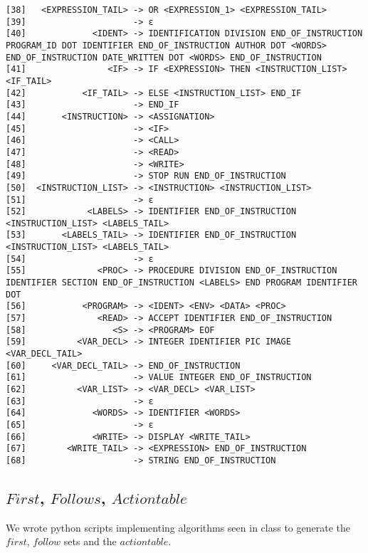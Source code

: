 \begin{lstlisting}[breaklines]
[38]   <EXPRESSION_TAIL> -> OR <EXPRESSION_1> <EXPRESSION_TAIL>
[39]                     -> ε
[40]             <IDENT> -> IDENTIFICATION DIVISION END_OF_INSTRUCTION PROGRAM_ID DOT IDENTIFIER END_OF_INSTRUCTION AUTHOR DOT <WORDS> END_OF_INSTRUCTION DATE_WRITTEN DOT <WORDS> END_OF_INSTRUCTION
[41]                <IF> -> IF <EXPRESSION> THEN <INSTRUCTION_LIST> <IF_TAIL>
[42]           <IF_TAIL> -> ELSE <INSTRUCTION_LIST> END_IF
[43]                     -> END_IF
[44]       <INSTRUCTION> -> <ASSIGNATION>
[45]                     -> <IF>
[46]                     -> <CALL>
[47]                     -> <READ>
[48]                     -> <WRITE>
[49]                     -> STOP RUN END_OF_INSTRUCTION
[50]  <INSTRUCTION_LIST> -> <INSTRUCTION> <INSTRUCTION_LIST>
[51]                     -> ε
[52]            <LABELS> -> IDENTIFIER END_OF_INSTRUCTION <INSTRUCTION_LIST> <LABELS_TAIL>
[53]       <LABELS_TAIL> -> IDENTIFIER END_OF_INSTRUCTION <INSTRUCTION_LIST> <LABELS_TAIL>
[54]                     -> ε
[55]              <PROC> -> PROCEDURE DIVISION END_OF_INSTRUCTION IDENTIFIER SECTION END_OF_INSTRUCTION <LABELS> END PROGRAM IDENTIFIER DOT
[56]           <PROGRAM> -> <IDENT> <ENV> <DATA> <PROC>
[57]              <READ> -> ACCEPT IDENTIFIER END_OF_INSTRUCTION
[58]                 <S> -> <PROGRAM> EOF
[59]          <VAR_DECL> -> INTEGER IDENTIFIER PIC IMAGE <VAR_DECL_TAIL>
[60]     <VAR_DECL_TAIL> -> END_OF_INSTRUCTION
[61]                     -> VALUE INTEGER END_OF_INSTRUCTION
[62]          <VAR_LIST> -> <VAR_DECL> <VAR_LIST>
[63]                     -> ε
[64]             <WORDS> -> IDENTIFIER <WORDS>
[65]                     -> ε
[66]             <WRITE> -> DISPLAY <WRITE_TAIL>
[67]        <WRITE_TAIL> -> <EXPRESSION> END_OF_INSTRUCTION
[68]                     -> STRING END_OF_INSTRUCTION
\end{lstlisting}

\subsection{$First$, $Follows$, $Action table$}

We wrote python scripts implementing algorithms seen in class to generate the $first$, $follow$ sets and the $action table$.

